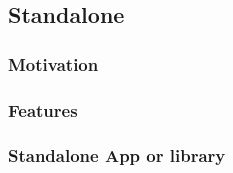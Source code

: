 \subsection{Standalone}

\subsubsection{Motivation}

\subsubsection{Features}

\subsubsection{Standalone App or library}

